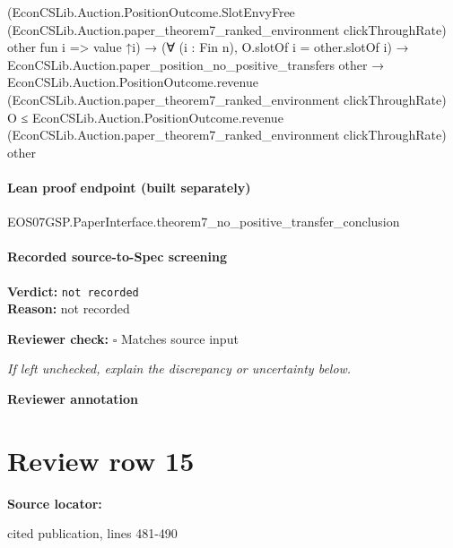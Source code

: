 \documentclass[10pt]{article}
\newcommand{\reviewerbox}{%
  \par\noindent\fbox{\parbox{0.96\linewidth}{\rule{0pt}{0.38in}}}\par
}
\newcommand{\reviewmatch}[1]{%
  \par\noindent\textbf{Reviewer check:} $\square$\; #1\par
  \noindent\emph{If left unchecked, explain the discrepancy or uncertainty below.}\par
}
\begin{document}
\begin{ReviewVerbatim}
                                    (EconCSLib.Auction.PositionOutcome.SlotEnvyFree
                                        (EconCSLib.Auction.paper_theorem7_ranked_environment clickThroughRate) other
                                        fun i => value ↑i) →
                                      (∀ (i : Fin n), O.slotOf i = other.slotOf i) →
                                        EconCSLib.Auction.paper_position_no_positive_transfers other →
                                          EconCSLib.Auction.PositionOutcome.revenue
                                              (EconCSLib.Auction.paper_theorem7_ranked_environment clickThroughRate) O ≤
                                            EconCSLib.Auction.PositionOutcome.revenue
                                              (EconCSLib.Auction.paper_theorem7_ranked_environment clickThroughRate)
                                              other
\end{ReviewVerbatim}

\paragraph{Lean proof endpoint (built separately)}\begin{ReviewVerbatim}
EOS07GSP.PaperInterface.theorem7_no_positive_transfer_conclusion
\end{ReviewVerbatim}

\paragraph{Recorded source-to-Spec screening}
\textbf{Verdict:} \texttt{not recorded}
\\
\textbf{Reason:} not recorded
\reviewmatch{Matches source input}
\noindent\textbf{Reviewer annotation}\par
\reviewerbox
\clearpage
\hypertarget{source-claim-0d815b3ab5e9277e}{}
\section*{Review row 15}
\textbf{Source locator:} {\footnotesize\raggedright cited publication, lines 481-\allowbreak{}490\par}
\end{document}
